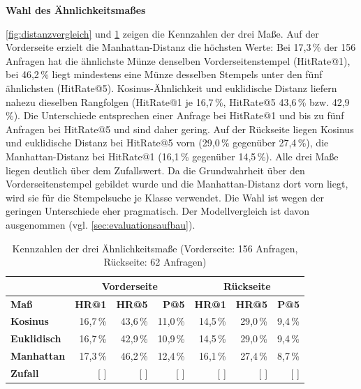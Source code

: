 \noindent \textbf{Wahl des Ähnlichkeitsmaßes}

\noindent \cref{fig:distanzvergleich} und \cref{tab:distanzen} zeigen die Kennzahlen der drei Maße. Auf der Vorderseite erzielt die Manhattan-Distanz die höchsten Werte: Bei 17,3\,\% der 156 Anfragen hat die ähnlichste Münze denselben Vorderseitenstempel (HitRate@1), bei 46,2\,\% liegt mindestens eine Münze desselben Stempels unter den fünf ähnlichsten (HitRate@5). Kosinus-Ähnlichkeit und euklidische Distanz liefern nahezu dieselben Rangfolgen (HitRate@1 je 16,7\,\%, HitRate@5 43,6\,\% bzw. 42,9\,\%). Die Unterschiede entsprechen einer Anfrage bei HitRate@1 und bis zu fünf Anfragen bei HitRate@5 und sind daher gering. Auf der Rückseite liegen Kosinus und euklidische Distanz bei HitRate@5 vorn (29,0\,\% gegenüber 27,4\,\%), die Manhattan-Distanz bei HitRate@1 (16,1\,\% gegenüber 14,5\,\%). Alle drei Maße liegen deutlich über dem Zufallswert. Da die Grundwahrheit über den Vorderseitenstempel gebildet wurde und die Manhattan-Distanz dort vorn liegt, wird sie für die Stempelsuche je Klasse verwendet. Die Wahl ist wegen der geringen Unterschiede eher pragmatisch. Der Modellvergleich ist davon ausgenommen (vgl. \cref{sec:evaluationsaufbau}).



\begin{table}[H]
\centering
\caption{Kennzahlen der drei Ähnlichkeitsmaße (Vorderseite: 156 Anfragen, Rückseite: 62 Anfragen)}
\label{tab:distanzen}
\begin{tabular}{|l|r|r|r|r|r|r|}
\hline
 & \multicolumn{3}{c|}{\textbf{Vorderseite}} & \multicolumn{3}{c|}{\textbf{Rückseite}} \\ \hline
\textbf{Maß} & \textbf{HR@1} & \textbf{HR@5} & \textbf{P@5} & \textbf{HR@1} & \textbf{HR@5} & \textbf{P@5} \\ \hline
\textbf{Kosinus}     & 16{,}7\,\% & 43{,}6\,\% & 11{,}0\,\% & 14{,}5\,\% & 29{,}0\,\% & 9{,}4\,\% \\ \hline
\textbf{Euklidisch}  & 16{,}7\,\% & 42{,}9\,\% & 10{,}9\,\% & 14{,}5\,\% & 29{,}0\,\% & 9{,}4\,\% \\ \hline
\textbf{Manhattan}   & 17{,}3\,\% & 46{,}2\,\% & 12{,}4\,\% & 16{,}1\,\% & 27{,}4\,\% & 8{,}7\,\% \\ \hline
\textbf{Zufall}      & [ ] & [ ] & [ ] & [ ] & [ ] & [ ] \\ \hline
\end{tabular}
\end{table}

